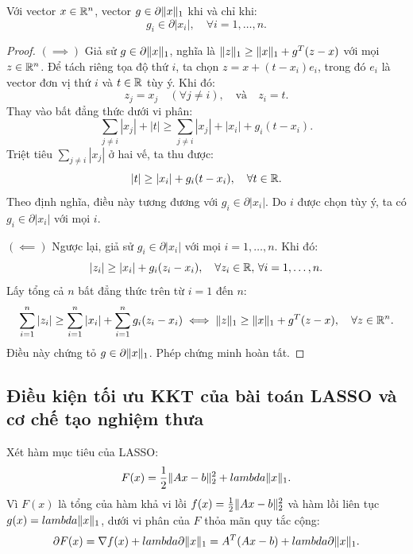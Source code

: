 \begin{theorem}
Với vector $x \in \mathbb{R}^n$, vector $g \in \partial \|x\|_1$ khi và chỉ khi:
\begin{equation}
    g_i \in \partial |x_i|, \quad \forall i = 1, \dots, n.
\end{equation}
\end{theorem}

\begin{proof}
$(\implies)$ Giả sử $g \in \partial \|x\|_1$, nghĩa là $\|z\|_1 \ge \|x\|_1 + g^T(z - x)$ với mọi $z \in \mathbb{R}^n$. Để tách riêng tọa độ thứ $i$, ta chọn $z = x + (t - x_i) e_i$, trong đó $e_i$ là vector đơn vị thứ $i$ và $t \in \mathbb{R}$ tùy ý. Khi đó:
\[
z_j = x_j \quad (\forall j \ne i), \quad \text{và} \quad z_i = t.
\]
Thay vào bất đẳng thức dưới vi phân:
\[
\sum_{j \ne i} |x_j| + |t| \ge \sum_{j \ne i} |x_j| + |x_i| + g_i(t - x_i).
\]
Triệt tiêu $\sum_{j \ne i} |x_j|$ ở hai vế, ta thu được:
\[
|t| \ge |x_i| + g_i(t - x_i), \quad \forall t \in \mathbb{R}.
\]
Theo định nghĩa, điều này tương đương với $g_i \in \partial |x_i|$. Do $i$ được chọn tùy ý, ta có $g_i \in \partial |x_i|$ với mọi $i$.

$(\impliedby)$ Ngược lại, giả sử $g_i \in \partial |x_i|$ với mọi $i = 1, \dots, n$. Khi đó:
\[
|z_i| \ge |x_i| + g_i(z_i - x_i), \quad \forall z_i \in \mathbb{R}, \, \forall i = 1, \dots, n.
\]
Lấy tổng cả $n$ bất đẳng thức trên từ $i = 1$ đến $n$:
\[
\sum_{i=1}^n |z_i| \ge \sum_{i=1}^n |x_i| + \sum_{i=1}^n g_i(z_i - x_i) \iff \|z\|_1 \ge \|x\|_1 + g^T(z - x), \quad \forall z \in \mathbb{R}^n.
\]
Điều này chứng tỏ $g \in \partial \|x\|_1$. Phép chứng minh hoàn tất.
\end{proof}

\subsection{Điều kiện tối ưu KKT của bài toán LASSO và cơ chế tạo nghiệm thưa}
Xét hàm mục tiêu của LASSO:
\begin{equation}
    F(x) = \frac{1}{2} \|Ax - b\|_2^2 + lambda \|x\|_1.
\end{equation}
Vì $F(x)$ là tổng của hàm khả vi lồi $f(x) = \frac{1}{2}\|Ax - b\|_2^2$ và hàm lồi liên tục $g(x) = lambda \|x\|_1$, dưới vi phân của $F$ thỏa mãn quy tắc cộng:
\begin{equation}
    \partial F(x) = \nabla f(x) + lambda \partial \|x\|_1 = A^T(Ax - b) + lambda \partial \|x\|_1.
\end{equation}

